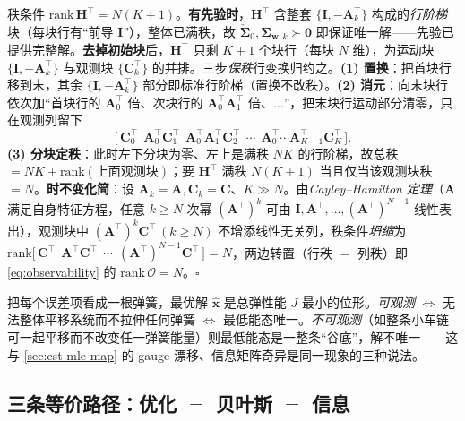 \begin{derivation}
秩条件 $\mathrm{rank}\,\mathbf{H}^\top=N(K+1)$。\textbf{有先验时}，$\mathbf{H}^\top$ 含整套 $\{\mathbf{I},-\mathbf{A}_k^\top\}$ 构成的\emph{行阶梯}块（每块行有“前导 $\mathbf{I}$”），整体已满秩，故 $\check{\boldsymbol{\Sigma}}_0,\boldsymbol{\Sigma}_{\mathbf{w},k}\succ\mathbf{0}$ 即保证唯一解——先验已提供完整解。\textbf{去掉初始块}后，$\mathbf{H}^\top$ 只剩 $K+1$ 个块行（每块 $N$ 维），为运动块 $\{\mathbf{I},-\mathbf{A}_k^\top\}$ 与观测块 $\{\mathbf{C}_k^\top\}$ 的并排。三步\emph{保秩}行变换归约之。\textbf{(1) 置换}：把首块行移到末，其余 $\{\mathbf{I},-\mathbf{A}_k^\top\}$ 部分即标准行阶梯（置换不改秩）。\textbf{(2) 消元}：向末块行依次加“首块行的 $\mathbf{A}_0^\top$ 倍、次块行的 $\mathbf{A}_0^\top\mathbf{A}_1^\top$ 倍、$\dots$”，把末块行运动部分清零，只在观测列留下
\[
  \big[\,\mathbf{C}_0^\top\ \ \mathbf{A}_0^\top\mathbf{C}_1^\top\ \ \mathbf{A}_0^\top\mathbf{A}_1^\top\mathbf{C}_2^\top\ \ \cdots\ \ \mathbf{A}_0^\top\!\cdots\!\mathbf{A}_{K-1}^\top\mathbf{C}_K^\top\,\big].
\]
\textbf{(3) 分块定秩}：此时左下分块为零、左上是满秩 $NK$ 的行阶梯，故总秩 $=NK+\mathrm{rank}(\text{上面观测块})$；要 $\mathbf{H}^\top$ 满秩 $N(K+1)$ 当且仅当该观测块秩 $=N$。\textbf{时不变化简}：设 $\mathbf{A}_k=\mathbf{A},\mathbf{C}_k=\mathbf{C}$、$K\gg N$。由\emph{Cayley--Hamilton 定理}（$\mathbf{A}$ 满足自身特征方程，任意 $k\ge N$ 次幂 $(\mathbf{A}^\top)^{k}$ 可由 $\mathbf{I},\mathbf{A}^\top,\dots,(\mathbf{A}^\top)^{N-1}$ 线性表出），观测块中 $(\mathbf{A}^\top)^{k}\mathbf{C}^\top\,(k\ge N)$ 不增添线性无关列，秩条件\emph{坍缩}为 $\mathrm{rank}\big[\,\mathbf{C}^\top\ \ \mathbf{A}^\top\mathbf{C}^\top\ \ \cdots\ \ (\mathbf{A}^\top)^{N-1}\mathbf{C}^\top\,\big]=N$，两边转置（行秩 $=$ 列秩）即 \cref{eq:observability} 的 $\mathrm{rank}\,\mathcal{O}=N$。\hfill$\square$
\end{derivation}

\begin{insight}[质量–弹簧直觉]
把每个误差项看成一根弹簧，最优解 $\hat{\mathbf{x}}$ 是总弹性能 $J$ 最小的位形。\emph{可观测} $\iff$ 无法整体平移系统而不拉伸任何弹簧 $\iff$ 最低能态唯一。\emph{不可观测}（如整条小车链可一起平移而不改变任一弹簧能量）则最低能态是一整条“谷底”，解不唯一——这与 \cref{sec:est-mle-map} 的 gauge 漂移、信息矩阵奇异是同一现象的三种说法。
\end{insight}

\subsection{三条等价路径：优化 \texorpdfstring{$=$}{=} 贝叶斯 \texorpdfstring{$=$}{=} 信息}
\label{sec:est-three-paths}

